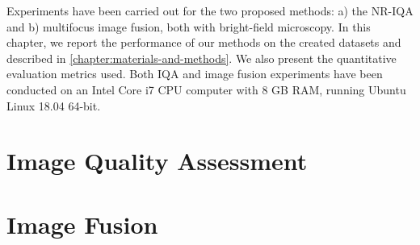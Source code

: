 Experiments have been carried out for the two proposed methods: a) the NR-IQA  and b) multifocus image fusion, both with bright-field microscopy. In this chapter, we report the performance of our methods on the created datasets and described in \autoref{chapter:materials-and-methods}. We also present the quantitative evaluation metrics used. Both IQA and image fusion experiments have been conducted on an Intel Core i7 CPU computer with 8 GB RAM, running Ubuntu Linux 18.04 64-bit.



\section{Image Quality Assessment}


\section{Image Fusion}
